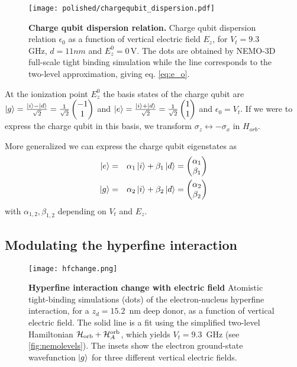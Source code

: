 \begin{figure}[h]
	\centering
	\texttt{[image: polished/chargequbit\_dispersion.pdf]}
	\caption[Charge qubit dispersion relation]{\textbf{Charge qubit dispersion relation.} Charge qubit dispersion relation $\epsilon_0$ as a function of vertical electric field $E_z$, for $V_t=9.3\,$GHz, $d=11nm$ and $E_z^0=0\,$V. The dots are obtained by NEMO-3D full-scale tight binding simulation while the line corresponds to the two-level approximation, giving eq. \eqref{eq:e_o}.}
	\label{fig:chargequbit}
\end{figure}

At the ionization point $E_z^0$ the basis states of the charge qubit are $\ket{g}=\frac{\ket{i}-\ket{d}}{\sqrt{2}}=\frac{1}{\sqrt{2}}\begin{pmatrix}-1\\1\end{pmatrix}$ and $\ket{e}=\frac{\ket{i}+\ket{d}}{\sqrt{2}}=\frac{1}{\sqrt{2}}\begin{pmatrix}1\\1\end{pmatrix}$ and $\epsilon_0=V_t$. 
If we were to express the charge qubit in this basis, we transform $\sigma_z\leftrightarrow-\sigma_x$ in $H_{orb}$.

More generalized we can express the charge qubit eigenstates as
\begin{eqnarray}\label{eq:chargestates_e}
\ket{e}&=&\alpha_1 \ket{i}+\beta_1\ket{d}=\begin{pmatrix}\alpha_1\\ \beta_1\end{pmatrix}\\
\label{eq:chargestates_g}
\ket{g}&=&\alpha_2 \ket{i}+\beta_2 \ket{d} =\begin{pmatrix}\alpha_2\\ \beta_2\end{pmatrix}
\end{eqnarray} with $\alpha_{1,2},\beta_{1,2}$ depending on $V_t$ and $E_z$. 


\subsection{Modulating the hyperfine interaction} \label{sec:hyperfine_modulation}
 

\begin{figure}[h]
	\centering
	\texttt{[image: hfchange.png]}
	\caption[Hyperfine interaction change with electric field]{\textbf{Hyperfine interaction change with electric field} Atomistic tight-binding simulations \cite{Klimeck2007a,Klimeck2007b} (dots) of the electron-nucleus hyperfine interaction, for a $z_d=15.2$~nm deep donor, as a function of vertical electric field. The solid line is a fit using the simplified two-level Hamiltonian $\mathcal{H}_{\rm orb}+\mathcal{H}_A^{\rm orb}$, which yields $V_t=9.3$~GHz (see \ref{fig:nemolevels}). The insets show the electron ground-state wavefunction $\ket{g}$ for three different vertical electric fields.}
	\label{fig:hfchange}
\end{figure}

